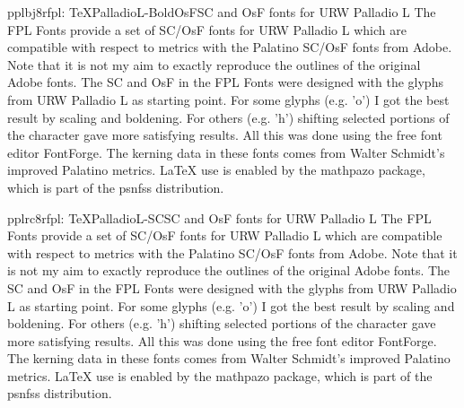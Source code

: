 \documentclass{ddltxtyp}
\begin{document}
\begin{package}{pplbj8r}{fpl: TeXPalladioL-BoldOsF}{SC and OsF fonts for URW Palladio L}
The FPL Fonts provide a set of SC/OsF fonts for URW Palladio L
which are compatible with respect to metrics with the Palatino
SC/OsF fonts from Adobe. Note that it is not my aim to exactly
reproduce the outlines of the original Adobe fonts. The SC and
OsF in the FPL Fonts were designed with the glyphs from URW
Palladio L as starting point. For some glyphs (e.g. 'o') I got
the best result by scaling and boldening. For others (e.g. 'h')
shifting selected portions of the character gave more
satisfying results. All this was done using the free font
editor FontForge. The kerning data in these fonts comes from
Walter Schmidt's improved Palatino metrics. {\LaTeX} use is
enabled by the mathpazo package, which is part of the psnfss
distribution.
\end{package}
\begin{package}{pplrc8r}{fpl: TeXPalladioL-SC}{SC and OsF fonts for URW Palladio L}
The FPL Fonts provide a set of SC/OsF fonts for URW Palladio L
which are compatible with respect to metrics with the Palatino
SC/OsF fonts from Adobe. Note that it is not my aim to exactly
reproduce the outlines of the original Adobe fonts. The SC and
OsF in the FPL Fonts were designed with the glyphs from URW
Palladio L as starting point. For some glyphs (e.g. 'o') I got
the best result by scaling and boldening. For others (e.g. 'h')
shifting selected portions of the character gave more
satisfying results. All this was done using the free font
editor FontForge. The kerning data in these fonts comes from
Walter Schmidt's improved Palatino metrics. {\LaTeX} use is
enabled by the mathpazo package, which is part of the psnfss
distribution.
\end{package}
\end{document}
